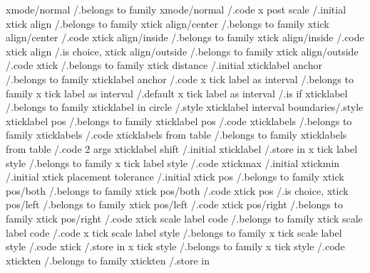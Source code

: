 xmode/normal                  /.belongs to family
xmode/normal                  /.code             
x post scale                  /.initial          
xtick align                   /.belongs to family
xtick align/center            /.belongs to family
xtick align/center            /.code             
xtick align/inside            /.belongs to family
xtick align/inside            /.code             
xtick align                   /.is choice,       
xtick align/outside           /.belongs to family
xtick align/outside           /.code             
xtick                         /.belongs to family
xtick distance                /.initial          
xticklabel anchor             /.belongs to family
xticklabel anchor             /.code             
x tick label as interval      /.belongs to family
x tick label as interval      /.default          
x tick label as interval      /.is if            
xticklabel                    /.belongs to family
xticklabel in circle          /.style            
xticklabel interval boundaries/.style            
xticklabel pos                /.belongs to family
xticklabel pos                /.code             
xticklabels                   /.belongs to family
xticklabels                   /.code             
xticklabels from table        /.belongs to family
xticklabels from table        /.code 2 args      
xticklabel shift              /.initial          
xticklabel                    /.store in         
x tick label style            /.belongs to family
x tick label style            /.code             
xtickmax                      /.initial          
xtickmin                      /.initial          
xtick placement tolerance     /.initial          
xtick pos                     /.belongs to family
xtick pos/both                /.belongs to family
xtick pos/both                /.code             
xtick pos                     /.is choice,       
xtick pos/left                /.belongs to family
xtick pos/left                /.code             
xtick pos/right               /.belongs to family
xtick pos/right               /.code             
xtick scale label code        /.belongs to family
xtick scale label code        /.code             
x tick scale label style      /.belongs to family
x tick scale label style      /.code             
xtick                         /.store in         
x tick style                  /.belongs to family
x tick style                  /.code             
xtickten                      /.belongs to family
xtickten                      /.store in         

